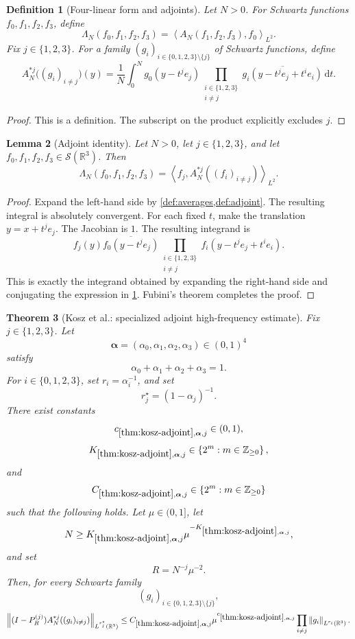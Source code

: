 \documentclass[11pt]{article}
\newtheorem{theorem}{Theorem}[section]
\newtheorem{lemma}[theorem]{Lemma}
\newtheorem{definition}[theorem]{Definition}
\newcommand{\R}{\mathbb{R}}
\newcommand{\Sch}{\mathcal{S}}
\newcommand{\dd}{\,\mathrm{d}}
\newcommand{\ip}[2]{\left\langle #1,#2\right\rangle}
\newcommand{\norm}[2]{\left\lVert #1\right\rVert_{#2}}
\newcommand{\Cst}[2]{C_{\ref{#1},#2}}
\newcommand{\Thr}[2]{K_{\ref{#1},#2}}
\newcommand{\set}[1]{\left\{#1\right\}}
\newcommand{\indices}{\{1,2,3\}}
\begin{document}
\begin{definition}[Four-linear form and adjoints]\label{def:adjoint}
Let \(N>0\).  For Schwartz functions \(f_0,f_1,f_2,f_3\), define
\[
\Lambda_N(f_0,f_1,f_2,f_3)=\ip{A_N(f_1,f_2,f_3)}{f_0}_{L^2}.
\]
Fix \(j\in\indices\).  For a family \((g_i)_{i\in\{0,1,2,3\}\setminus\{j\}}\) of Schwartz functions, define
\[
A_N^{*j}\bigl((g_i)_{i\neq j}\bigr)(y)
=
\frac1N\int_0^N g_0(y-t^j e_j)
\prod_{\substack{i\in\indices\\i\neq j}}
\overline{g_i(y-t^j e_j+t^i e_i)}\dd t.
\]
\end{definition}

\begin{proof}
This is a definition.  The subscript on the product explicitly excludes \(j\).
\end{proof}

\begin{lemma}[Adjoint identity]\label{lem:adjoint-identity}
Let \(N>0\), let \(j\in\indices\), and let \(f_0,f_1,f_2,f_3\in\Sch(\R^3)\).  Then
\[
\Lambda_N(f_0,f_1,f_2,f_3)
=
\ip{f_j}{A_N^{*j}((f_i)_{i\neq j})}_{L^2}.
\]
\end{lemma}

\begin{proof}
Expand the left-hand side by \cref{def:averages,def:adjoint}.  The resulting integral is absolutely convergent.  For each fixed \(t\), make the translation \(y=x+t^j e_j\).  The Jacobian is \(1\).  The resulting integrand is
\[
f_j(y)\overline{f_0(y-t^j e_j)}
\prod_{\substack{i\in\indices\\i\neq j}}f_i(y-t^j e_j+t^i e_i).
\]
This is exactly the integrand obtained by expanding the right-hand side and conjugating the expression in \cref{def:adjoint}.  Fubini's theorem completes the proof.
\end{proof}

\begin{theorem}[Kosz et al.: specialized adjoint high-frequency estimate]\label{thm:kosz-adjoint}
Fix \(j\in\indices\).  Let
\[
\boldsymbol\alpha=(\alpha_0,\alpha_1,\alpha_2,\alpha_3)\in(0,1)^4
\]
satisfy
\[
\alpha_0+\alpha_1+\alpha_2+\alpha_3=1.
\]
For \(i\in\{0,1,2,3\}\), set \(r_i=\alpha_i^{-1}\), and set
\[
r_j^\star=(1-\alpha_j)^{-1}.
\]
There exist constants
\[
c_{\ref{thm:kosz-adjoint},\boldsymbol\alpha,j}\in(0,1),
\]
\[
\Thr{thm:kosz-adjoint}{\boldsymbol\alpha,j}\in\set{2^m:m\in\mathbb Z_{\geq0}},
\]
and
\[
\Cst{thm:kosz-adjoint}{\boldsymbol\alpha,j}\in\set{2^m:m\in\mathbb Z_{\geq0}}
\]
such that the following holds.  Let \(\mu\in(0,1]\), let
\[
N\geq\Thr{thm:kosz-adjoint}{\boldsymbol\alpha,j}
\mu^{-\Thr{thm:kosz-adjoint}{\boldsymbol\alpha,j}},
\]
and set
\[
R=N^{-j}\mu^{-2}.
\]
Then, for every Schwartz family
\[
(g_i)_{i\in\{0,1,2,3\}\setminus\{j\}},
\]
\[
\norm{(I-P_R^{(j)})A_N^{*j}((g_i)_{i\neq j})}{L^{r_j^\star}(\R^3)}
\leq
\Cst{thm:kosz-adjoint}{\boldsymbol\alpha,j}
\mu^{c_{\ref{thm:kosz-adjoint},\boldsymbol\alpha,j}}
\prod_{i\neq j}\norm{g_i}{L^{r_i}(\R^3)}.
\]
\end{theorem}
\end{document}
